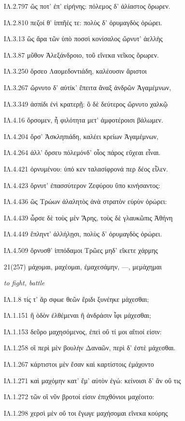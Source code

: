 \begin{enumerate}
{ΙΛ.2.797 ὥς ποτ' ἐπ' εἰρήνης: πόλεμος δ' ἀλίαστος ὄρωρεν.

ΙΛ.2.810 πεζοί θ' ἱππῆές τε: πολὺς δ' ὀρυμαγδὸς ὀρώρει.

ΙΛ.3.13 ὣς ἄρα τῶν ὑπὸ ποσσὶ κονίσαλος ὤρνυτ' ἀελλὴς

ΙΛ.3.87 μῦθον Ἀλεξάνδροιο, τοῦ εἵνεκα νεῖκος ὄρωρεν.

ΙΛ.3.250 ὄρσεο Λαομεδοντιάδη, καλέουσιν ἄριστοι

ΙΛ.3.267 ὤρνυτο δ' αὐτίκ' ἔπειτα ἄναξ ἀνδρῶν Ἀγαμέμνων,

ΙΛ.3.349 ἀσπίδι ἐνὶ κρατερῇ: ὃ δὲ δεύτερος ὤρνυτο χαλκῷ

ΙΛ.4.16 ὄρσομεν, ἦ φιλότητα μετ' ἀμφοτέροισι βάλωμεν.

ΙΛ.4.204 ὄρσ' Ἀσκληπιάδη, καλέει κρείων Ἀγαμέμνων,

ΙΛ.4.264 ἀλλ' ὄρσευ πόλεμόνδ' οἷος πάρος εὔχεαι εἶναι.

ΙΛ.4.421 ὀρνυμένου: ὑπό κεν ταλασίφρονά περ δέος εἷλεν.

ΙΛ.4.423 ὄρνυτ' ἐπασσύτερον Ζεφύρου ὕπο κινήσαντος:

ΙΛ.4.436 ὣς Τρώων ἀλαλητὸς ἀνὰ στρατὸν εὐρὺν ὀρώρει:

ΙΛ.4.439 ὦρσε δὲ τοὺς μὲν Ἄρης, τοὺς δὲ γλαυκῶπις Ἀθήνη

ΙΛ.4.449 ἔπληντ' ἀλλήλῃσι, πολὺς δ' ὀρυμαγδὸς ὀρώρει.

ΙΛ.4.509 ὄρνυσθ' ἱππόδαμοι Τρῶες μηδ' εἴκετε χάρμης

}

\clearpage
\item[\large 21(257)]{\large \g μάχομαι, μαχέομαι, ἐμαχεσάμην, ---, μεμάχημαι      }

\hspace{0.2cm} \textit{   to fight, battle}

{\g
ΙΛ.1.8 τίς τ' ἄρ σφωε θεῶν ἔριδι ξυνέηκε μάχεσθαι;

ΙΛ.1.151 ἢ ὁδὸν ἐλθέμεναι ἢ ἀνδράσιν ἶφι μάχεσθαι;

ΙΛ.1.153 δεῦρο μαχησόμενος, ἐπεὶ οὔ τί μοι αἴτιοί εἰσιν:

ΙΛ.1.258 οἳ περὶ μὲν βουλὴν Δαναῶν, περὶ δ' ἐστὲ μάχεσθαι.

ΙΛ.1.267 κάρτιστοι μὲν ἔσαν καὶ καρτίστοις ἐμάχοντο

ΙΛ.1.271 καὶ μαχόμην κατ' ἔμ' αὐτὸν ἐγώ: κείνοισι δ' ἂν οὔ τις

ΙΛ.1.272 τῶν οἳ νῦν βροτοί εἰσιν ἐπιχθόνιοι μαχέοιτο:

ΙΛ.1.298 χερσὶ μὲν οὔ τοι ἔγωγε μαχήσομαι εἵνεκα κούρης

}
\end{enumerate}
